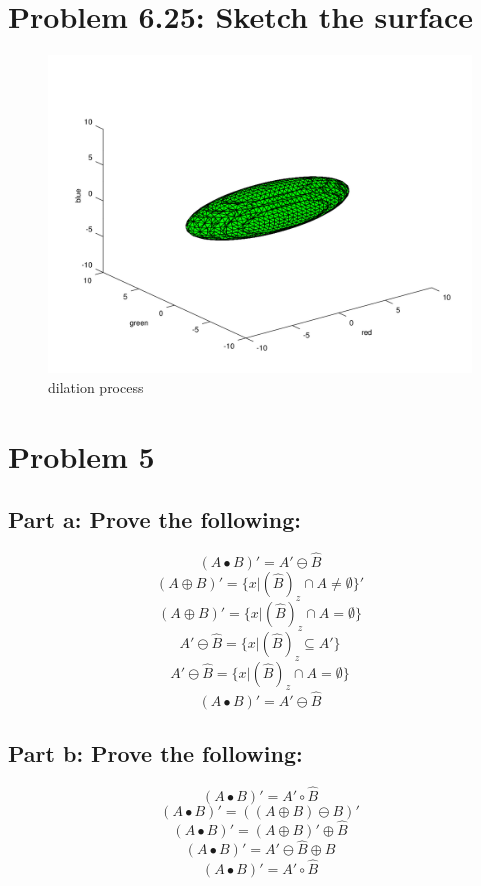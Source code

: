 \documentclass{article}
\begin{document}
	\newpage
	\section{Problem 6.25: Sketch the surface}
	\begin{figure}[H]
		\includegraphics[width=\linewidth]{6.28/part1.png}
		\caption{dilation process}
	\end{figure}
	
	\newpage
	\section{Problem 5}
	\subsection{Part a: Prove the following:}
	\[(A\bullet{B})' = A'\ominus{\hat{B}}\]
	\[(A\oplus{B})' = \{x|(\hat{B})_z\cap{A} \neq{} \emptyset\}'\]
	\[(A\oplus{B})' = \{x|(\hat{B})_z\cap{A} = \emptyset\}\]
	\[A'\ominus{\hat{B}} = \{x|(\hat{B})_z\subseteq{A'}\} \]
	\[A'\ominus{\hat{B}} = \{x|(\hat{B})_z\cap{A} = \emptyset\} \]
	\[(A\bullet{B})' = A'\ominus{\hat{B}}\]
	
	\subsection{Part b: Prove the following:}
	\[(A\bullet{B})' = A'\circ{\hat{B}}\]
	\[(A\bullet{B})' = ((A\oplus{B})\ominus{B})'\]
	\[(A\bullet{B})' = (A\oplus{B})'\oplus{\hat{B}}\]
	\[(A\bullet{B})' = A'\ominus{\hat{B}}\oplus{\hat{B}}\]
	\[(A\bullet{B})' = A'\circ{\hat{B}}\]
	
\end{document}
